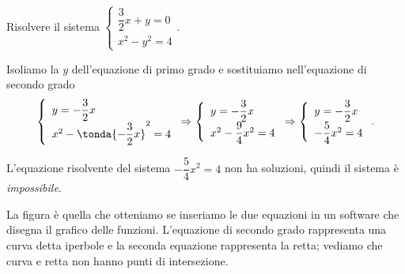 \begin{esempio}
Risolvere il sistema \(\left\{\begin{array}{l}\dfrac 3 
2x+y=0\\x^2-y^2=4\end{array}\right..\)

Isoliamo la \(y\) dell'equazione di primo grado e sostituiamo nell'equazione di 
secondo grado 
\[\left\{\begin{array}{l}y=-\dfrac 3 2x \\
x^2-\tonda{-\dfrac 3 2x}^2=4\end{array}\right.
\Rightarrow \left\{\begin{array}{l}y=-\dfrac 3 2x \\
x^2-\dfrac 9 4x^2=4\end{array}\right.
\Rightarrow \left\{\begin{array}{l}y=-\dfrac 3 2x\\
-\dfrac 5 4x^2=4\end{array}\right..\]

L'equazione risolvente del sistema \(-\dfrac 5 4x^2=4\) non ha soluzioni, 
quindi 
il 
sistema è \emph{impossibile}.
\begin{multicols}{2}
La figura è quella che otteniamo se inseriamo le due equazioni in un software 
che disegna il grafico delle funzioni. 
L'equazione di secondo grado rappresenta una curva detta iperbole e la seconda 
equazione rappresenta la retta; vediamo che curva e retta non hanno punti di 
intersezione.
\begin{center}

\end{center}
\end{multicols}
\end{esempio}


